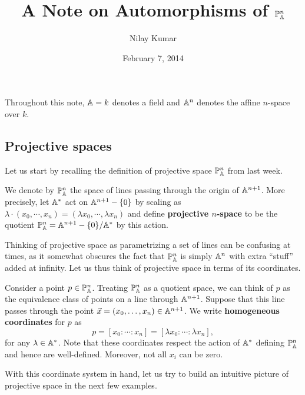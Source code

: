 \documentclass{../../mathnotes}
\title{A Note on Automorphisms of $\mathbb{P}^n_{\mathbb{A}}$}
\author{Nilay Kumar}
\date{February 7, 2014}
\begin{document}
\maketitle


Throughout this note, $\mathbb{A}=k$ denotes a field and $\mathbb{A}^n$ denotes the affine $n$-space over $k$.

\subsection*{Projective spaces}

Let us start by recalling the definition of projective space $\mathbb{P}^n_{\mathbb{A}}$ from last week.
\begin{defn}
    We denote by $\mathbb{P}_{\mathbb{A}}^n$ the space of lines passing through the origin of $\mathbb{A}^{n+1}$.
    More precisely, let $\mathbb{A}^*$ act on $\mathbb{A}^{n+1}-\{0\}$ by scaling as $\lambda\cdot(x_0,\cdots,x_n)=(\lambda x_0,\cdots, \lambda x_n)$
    and define \textbf{projective $n$-space} to be the quotient $\mathbb{P}_{\mathbb{A}}^n=\mathbb{A}^{n+1}-\{0\}/\mathbb{A}^*$ by this action.
\end{defn}

Thinking of projective space as parametrizing a set of lines can be confusing at times, as it somewhat
obscures the fact that $\mathbb{P}_{\mathbb{A}}^n$ is simply $\mathbb{A}^n$ with extra ``stuff'' added at infinity. Let us thus think
of projective space in terms of its coordinates.

\begin{defn}
    Consider a point $p\in\mathbb{P}_{\mathbb{A}}^n$. Treating $\mathbb{P}_{\mathbb{A}}^n$ as a quotient space, we can think of $p$ as the equivalence class
    of points on a line through $\mathbb{A}^{n+1}$. Suppose that this line passes through the point $\vec x=(x_0,\ldots, x_n)\in\mathbb{A}^{n+1}$.
    We write \textbf{homogeneous coordinates} for $p$ as
    \[p=[x_0:\cdots:x_n]=[\lambda x_0:\cdots:\lambda x_n],\]
    for any $\lambda\in\mathbb{A}^*$. Note that these coordinates respect the action of $\mathbb{A}^*$ defining $\mathbb{P}_{\mathbb{A}}^n$ and hence are well-defined.
    Moreover, not all $x_i$ can be zero.
\end{defn}

With this coordinate system in hand, let us try to build an intuitive picture of projective space
in the next few examples.
\end{document}
